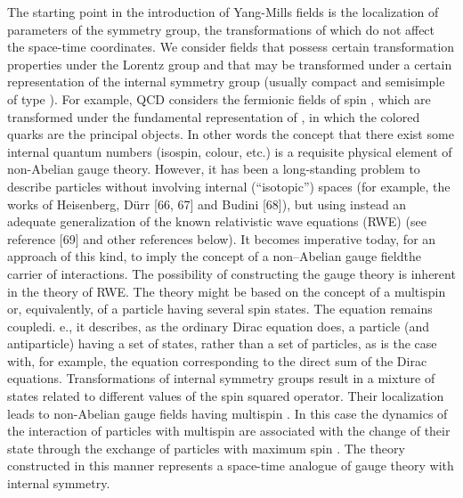 \documentclass[a4paper,12pt]{article}
\begin{document}
The starting point in the introduction of Yang-Mills fields is the
localization of parameters of the symmetry group, the transformations of
which do not affect the space-time coordinates. We consider fields \coordHE{}
that possess certain transformation properties under the Lorentz group and
that may be transformed under a certain representation of the internal
symmetry group (usually compact and semisimple of type \coordHE{}). For
example, QCD considers the fermionic fields of spin \coordHE{}, which are
transformed under the fundamental representation of \coordHE{}, in which the
colored quarks are the principal objects. In other words the concept that
there exist some internal quantum numbers (isospin, colour, etc.) is a
requisite physical element of non-Abelian gauge theory. However, it has been
a long-standing problem to describe particles without involving internal
(``isotopic'') spaces (for example, the works of Heisenberg, D\"urr [66, 67]
and Budini [68]), but using instead an adequate generalization of the known
relativistic wave equations (RWE) (see reference [69] and other references
below). It becomes imperative today, for an approach of this kind, to imply
the concept of a non--Abelian gauge field\myHighlight{$-$}\coordHE{}the carrier of interactions. The
possibility of constructing the gauge theory is inherent in the theory of
RWE. The theory might be based on the concept of a multispin or,
equivalently, of a particle having several spin states. The equation remains
coupled\myHighlight{$-$}\coordHE{}i. e., it describes, as the ordinary Dirac equation does, a
particle (and antiparticle) having a set of states, rather than a set of
particles, as is the case with, for example, the equation corresponding to
the direct sum of the Dirac equations. Transformations of internal symmetry
groups result in a mixture of states related to different values of the spin
squared operator. Their localization leads to non-Abelian gauge fields
having multispin \coordHE{}. In this case the dynamics of the interaction of
particles with multispin \coordHE{} are associated with the change of their state
through the exchange of particles with maximum spin \coordHE{}. The theory
constructed in this manner represents a space-time analogue of gauge theory
with internal symmetry.
\end{document}
